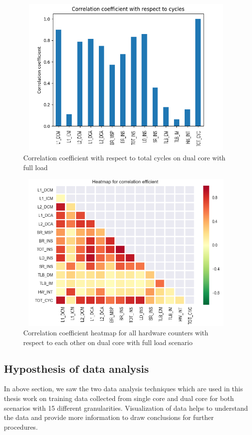 \begin{figure}[h!]
\includegraphics[width=12cm, height=8cm]{./images/CC_full_load}
\centering
\caption{Correlation coefficient with respect to total cycles on dual  core with full load}
\label{fig:flow}
\end{figure}

\begin{figure}[h!]
\includegraphics[width=12cm, height=8cm]{./images/heatmap_full_load}
\centering
\caption{Correlation coefficient heatmap for all hardware counters with respect to each other on dual core with full load scenario}
\label{fig:flow}
\end{figure}

\subsection{Hyposthesis of data analysis}
In above section, we saw the two data analysis techniques which are used in this thesis work on training data collected from single core and dual core for both scenarios with 15 different granularities. Visualization of data helps to understand the data and provide more information to draw conclusions for further procedures. 

